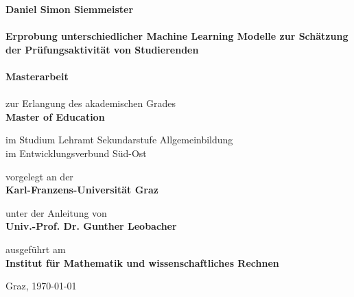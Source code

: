 

\begin{titlepage}
    \begin{center}
    \Huge{\textbf{Daniel Simon Siemmeister}}\\
    \ \\
    \sffamily
    \Huge{\textbf{Erprobung unterschiedlicher Machine Learning Modelle zur Sch\"atzung der Pr\"ufungsaktivit\"at von Studierenden}}\\
    \rmfamily
    \ \\
    \Huge{\textbf{Masterarbeit}}\\
    \ \\
    \large{zur Erlangung des akademischen Grades}\\
    \large{\textbf{Master of Education}}
    
    
    \large{im Studium Lehramt Sekundarstufe Allgemeinbildung}\\
    \large{im Entwicklungsverbund Süd-Ost}

    
    \large{vorgelegt an der}\\
    \large{\textbf{Karl-Franzens-Universität Graz}}
    

    \large{unter der Anleitung von}\\
    \large{\textbf{Univ.-Prof. Dr. Gunther Leobacher}}
    

    \large{ausgef\"uhrt am}\\
    \large{\textbf{Institut f\"ur Mathematik und wissenschaftliches Rechnen}}
    
    
    \end{center}
    \vspace{2cm}
    \normalsize{Graz, \today{}}
    
    \end{titlepage}
    
